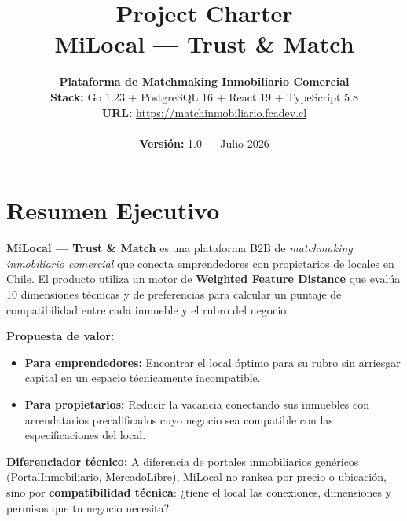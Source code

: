 \documentclass[11pt,a4paper]{article}
\title{\vspace{-2cm}\textbf{Project Charter \\ MiLocal — Trust \& Match}}
\author{
    \textbf{Plataforma de Matchmaking Inmobiliario Comercial} \\
    \textbf{Stack:} Go 1.23 + PostgreSQL 16 + React 19 + TypeScript 5.8 \\
    \textbf{URL:} \url{https://matchinmobiliario.fcadev.cl} \\
    \\
    \textbf{Versión:} 1.0 — Julio 2026
}
\date{}
\begin{document}
\maketitle
\thispagestyle{empty}
\newpage

\tableofcontents
\newpage

\section{Resumen Ejecutivo}

\textbf{MiLocal — Trust \& Match} es una plataforma B2B de \textit{matchmaking inmobiliario comercial} que conecta emprendedores con propietarios de locales en Chile. El producto utiliza un motor de \textbf{Weighted Feature Distance} que evalúa 10 dimensiones técnicas y de preferencias para calcular un puntaje de compatibilidad entre cada inmueble y el rubro del negocio.

\textbf{Propuesta de valor:}
\begin{itemize}
    \item \textbf{Para emprendedores:} Encontrar el local óptimo para su rubro sin arriesgar capital en un espacio técnicamente incompatible.
    \item \textbf{Para propietarios:} Reducir la vacancia conectando sus inmuebles con arrendatarios precalificados cuyo negocio sea compatible con las especificaciones del local.
\end{itemize}

\textbf{Diferenciador técnico:} A diferencia de portales inmobiliarios genéricos (PortalInmobiliario, MercadoLibre), MiLocal no rankea por precio o ubicación, sino por \textbf{compatibilidad técnica}: ¿tiene el local las conexiones, dimensiones y permisos que tu negocio necesita?
\end{document}
